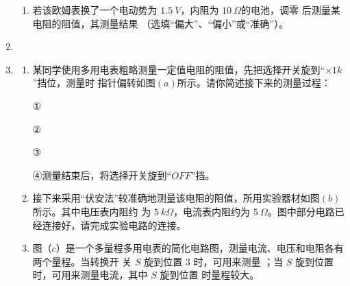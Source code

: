 \begin{enumerate}
\begin{enumerate}
\item 
若该欧姆表换了一个电动势为 $ 1.5 \ V $，内阻为 $ 10 \ \Omega $的电池，调零
后测量某电阻的阻值，其测量结果 \underlinegap （选填“偏大”、“偏小”或“准确”）。


\end{enumerate}



\item 
{}
\item 
\begin{enumerate}
\item
某同学使用多用电表粗略测量一定值电阻的阻值，先把选择开关旋到“$ \times 1k $”挡位，测量时
指针偏转如图$ (a) $所示。请你简述接下来的测量过程：

① \hthreefullline[;] 

② \hthreefullline[;] 

③ \hthreefullline[;] 

④测量结束后，将选择开关旋到“$ OFF $”挡。


\item 
接下来采用“伏安法”较准确地测量该电阻的阻值，所用实验器材如图$ (b) $所示。其中电压表内阻约
为 $ 5 \ k\Omega $，电流表内阻约为 $ 5 \ \Omega $。图中部分电路已经连接好，请完成实验电路的连接。


\item 
图（$ c $）是一个多量程多用电表的简化电路图，测量电流、电压和电阻各有两个量程。当转换开
关 $ S $ 旋到位置 $ 3 $ 时，可用来测量 \underlinegap 
；当 $ S $ 旋到位置
\underlinegap 
时，可用来测量电流，其中 $ S $
旋到位置 \underlinegap 时量程较大。



\end{enumerate}
\end{enumerate}
